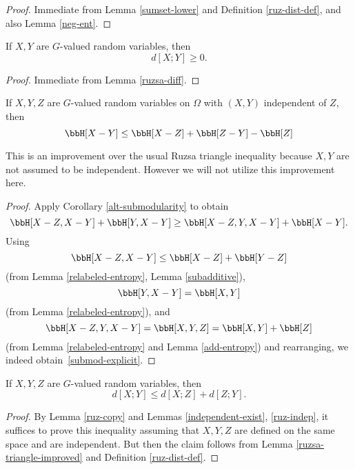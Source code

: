\begin{proof}  \leanok Immediate from Lemma \ref{sumset-lower} and Definition \ref{ruz-dist-def}, and also Lemma \ref{neg-ent}.
\end{proof}

\begin{lemma}\label{ruzsa-nonneg}
  \leanok
  If $X,Y$ are $G$-valued random variables, then
  $$ d[X;Y] \geq 0.$$
\end{lemma}

\begin{proof}
  \leanok
  Immediate from Lemma \ref{ruzsa-diff}.
\end{proof}

\begin{lemma}\label{ruzsa-triangle-improved}\leanok  If $X,Y,Z$ are $G$-valued random variables on $\Omega$ with $(X,Y)$ independent of $Z$, then
  \begin{equation}\label{submod-explicit} \bbH[X - Y] \leq \bbH[X-Z] + \bbH[Z-Y] - \bbH[Z]\end{equation}
\end{lemma}

This is an improvement over the usual Ruzsa triangle inequality because $X,Y$ are not assumed to be independent.  However we will not utilize this improvement here.

\begin{proof}
  \leanok
  Apply Corollary \ref{alt-submodularity} to obtain
  \[ \bbH[X - Z, X - Y] + \bbH[Y, X - Y] \geq \bbH[X - Z, Y, X - Y] + \bbH[X - Y].\]
  Using
  \[ \bbH[X - Z, X - Y] \leq \bbH[X - Z] + \bbH[Y - Z]\]
  (from Lemma \ref{relabeled-entropy}, Lemma \ref{subadditive}),
  \[ \bbH[Y, X - Y] = \bbH[X, Y] \]
  (from Lemma \ref{relabeled-entropy}), and
  \[ \bbH[X - Z, Y, X - Y] = \bbH[X, Y, Z] = \bbH[X, Y] + \bbH[Z]\]
  (from Lemma \ref{relabeled-entropy} and Lemma \ref{add-entropy}) and rearranging, we indeed obtain~\eqref{submod-explicit}.
\end{proof}

\begin{lemma}
  \label{ruzsa-triangle}
  \leanok
  If $X,Y,Z$ are $G$-valued random variables, then
$$ d[X;Y] \leq d[X;Z] + d[Z;Y].$$
\end{lemma}

\begin{proof}\leanok By Lemma \ref{ruz-copy} and Lemmas \ref{independent-exist}, \ref{ruz-indep}, it suffices to prove this inequality assuming that $X,Y,Z$ are defined on the same space and are independent.  But then the claim follows from Lemma \ref{ruzsa-triangle-improved} and Definition \ref{ruz-dist-def}.
\end{proof}


